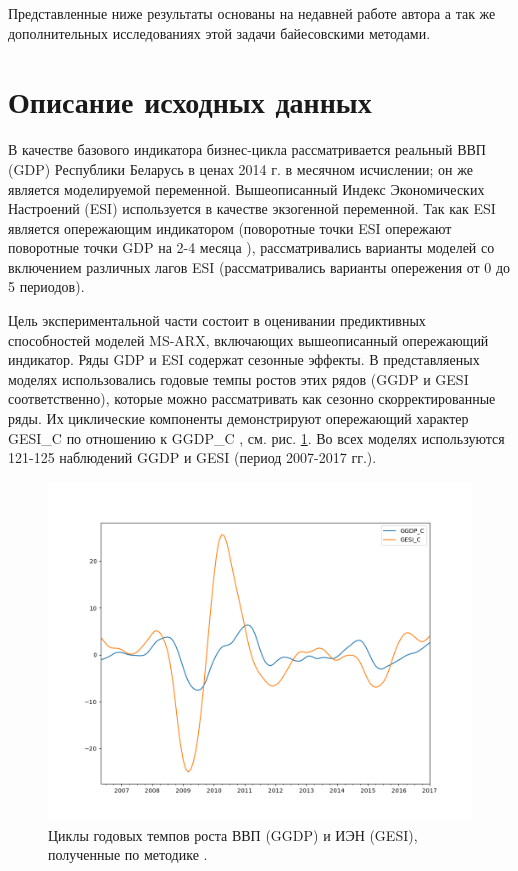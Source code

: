 \documentclass[a4paper,14pt]{extreport}
\begin{document}
Представленные ниже результаты основаны на недавней работе автора \cite{mak_mal_bv_2020} а так же дополнительных исследованиях этой задачи байесовскими методами.


\section{Описание исходных данных}

\label{section:gdp_data}

В качестве базового индикатора бизнес-цикла рассматривается реальный ВВП (GDP) Республики Беларусь в ценах 2014 г. в месячном исчислении; он же является моделируемой переменной. Вышеописанный Индекс Экономических Настроений (ESI) используется в качестве экзогенной переменной. Так как ESI является опережающим индикатором (поворотные точки ESI опережают поворотные точки GDP на 2-4 месяца \cite{esiMaking,esiExtra}), рассматривались варианты моделей со включением различных лагов ESI (рассматривались варианты опережения от 0 до 5 периодов). 

Цель экспериментальной части \cite{mak_mal_bv_2020} состоит в оценивании предиктивных способностей моделей MS-ARX, включающих вышеописанный опережающий индикатор. Ряды GDP и ESI содержат сезонные эффекты. В представляеных моделях использовались годовые темпы ростов этих рядов (GGDP и GESI соответственно), которые можно рассматривать как сезонно скорректированные ряды. Их циклические компоненты демонстрируют опережающий характер GESI\_C по отношению к GGDP\_C \cite{mak_mal_bv_2020}, см. рис. \ref{fig:ggdp_gesi_cycles}. Во всех моделях используются 121-125 наблюдений GGDP и GESI (период 2007-2017 гг.).

\begin{figure}[H]
	\includegraphics[width=\linewidth]{img/manual/ggdp_gesi_cycles.png}
	\caption{Циклы годовых темпов роста ВВП (GGDP) и ИЭН (GESI), полученные по методике \cite{esiMaking}. }
	\label{fig:ggdp_gesi_cycles}
\end{figure}
\end{document}

